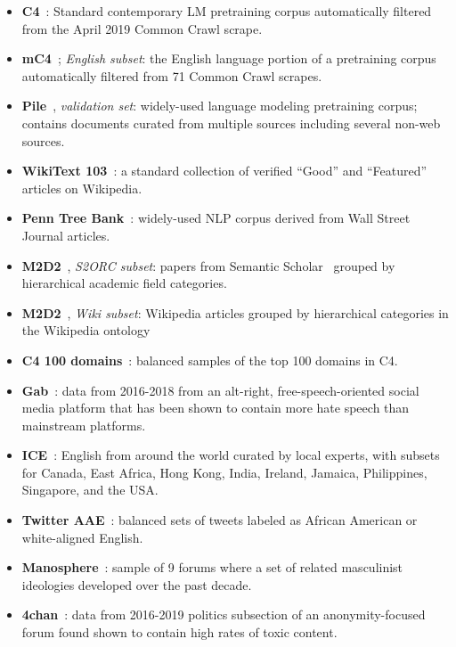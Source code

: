\begin{itemize}[leftmargin=1em]
    \item \textbf{C4}~\citep{raffel2020exploring,dodge-etal-2021-documenting}: Standard contemporary LM pretraining corpus automatically filtered from the April 2019 Common Crawl scrape.
    \item \textbf{mC4}~\citep{mc4}; \textit{English subset}: the English language portion of a pretraining corpus automatically filtered from 71 Common Crawl scrapes.
    \item \textbf{Pile}~\citep{Gao2020ThePA}, \textit{validation set}: widely-used language modeling pretraining corpus; 
    contains documents curated from multiple sources including several non-web sources.
    \item \textbf{WikiText 103}~\citep{merity2016pointer}: a standard collection of verified “Good” and “Featured” articles on Wikipedia.
    \item \textbf{Penn Tree Bank}~\citep{marcus-etal-1994-penn}: widely-used NLP corpus derived from Wall Street Journal articles.
    
    \item \textbf{M2D2}~\citep{reid-etal-2022-m2d2}, \textit{S2ORC subset}: papers from Semantic Scholar~\citep{lo-etal-2020-s2orc} grouped by hierarchical academic field categories.
    \item \textbf{M2D2}~\citep{reid-etal-2022-m2d2}, \textit{Wiki subset}: Wikipedia articles grouped by hierarchical categories in the Wikipedia ontology
    \item \textbf{C4 100 domains}~\citep{chronopoulou-etal-2022-efficient}: balanced samples of the top 100 domains in C4.
    \item \textbf{Gab}~\citep{zannettou2018gab}: data from 2016-2018 from an alt-right, free-speech-oriented social media platform that has been shown to contain more hate speech than mainstream platforms. 
    
    \item \textbf{ICE}~\citep{greenbaum1991ice}: English from around the world curated by local experts, with subsets for Canada, East Africa, Hong Kong, India, Ireland, Jamaica, Philippines, Singapore, and the USA.

    \item \textbf{Twitter AAE}~\citep{blodgett-etal-2016-demographic}: balanced sets of tweets labeled as African American or white-aligned English.
    \item \textbf{Manosphere}~\citep{ribeiroevolution2021}: sample of 9 forums where a set of related masculinist ideologies developed over the past decade.
    \item \textbf{4chan}~\citep{papasavva2020raiders}: data from 2016-2019 politics subsection of an anonymity-focused forum found shown to contain high rates of toxic content.
    
\end{itemize}

